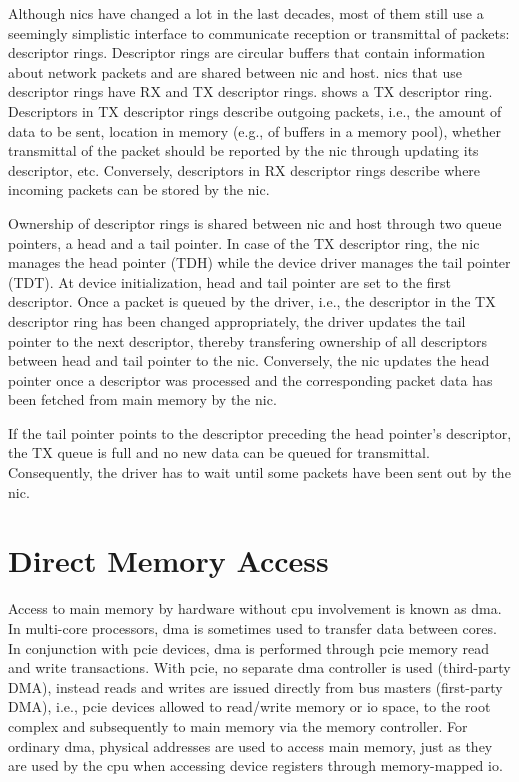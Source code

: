 Although \acp{nic} have changed a lot in the last decades, most of them still
use a seemingly simplistic interface to communicate reception or transmittal of
packets: descriptor rings. Descriptor rings are circular buffers that contain
information about network packets and are shared between \ac{nic} and host.
\acp{nic} that use descriptor rings have RX and TX descriptor rings.
 shows a TX descriptor ring. Descriptors in TX descriptor
rings describe outgoing packets, i.e., the amount of data to be sent, location
in memory (e.g., of buffers in a memory pool), whether transmittal of the packet
should be reported by the \ac{nic} through updating its descriptor, etc.
Conversely, descriptors in RX descriptor rings describe where incoming packets
can be stored by the \ac{nic}.

Ownership of descriptor rings is shared between \ac{nic} and host through two
queue pointers, a head and a tail pointer. In case of the TX descriptor ring,
the \ac{nic} manages the head pointer (TDH) while the device driver manages the
tail pointer (TDT). At device initialization, head and tail pointer are set to
the first descriptor. Once a packet is queued by the driver, i.e., the
descriptor in the TX descriptor ring has been changed appropriately, the driver
updates the tail pointer to the next descriptor, thereby transfering ownership
of all descriptors between head and tail pointer to the \ac{nic}. Conversely,
the \ac{nic} updates the head pointer once a descriptor was processed and the
corresponding packet data has been fetched from main memory by the \ac{nic}.

If the tail pointer points to the descriptor preceding the head pointer's
descriptor, the TX queue is full and no new data can be queued for transmittal.
Consequently, the driver has to wait until some packets have been sent out by
the \ac{nic}.


\section{Direct Memory Access}
\label{sec:dma}

Access to main memory by hardware without \ac{cpu} involvement is known as
\acf{dma}. In multi-core processors, \ac{dma} is sometimes used to transfer data
between cores. In conjunction with \ac{pcie} devices, \ac{dma} is performed
through \ac{pcie} memory read and write transactions. With \ac{pcie}, no
separate \ac{dma} controller is used (third-party DMA), instead reads and writes
are issued directly from bus masters (first-party DMA), i.e., \ac{pcie} devices
allowed to read/write memory or \ac{io} space, to the root complex and
subsequently to main memory via the memory controller. For ordinary \ac{dma},
physical addresses are used to access main memory, just as they are used by the
\ac{cpu} when accessing device registers through memory-mapped \ac{io}.

